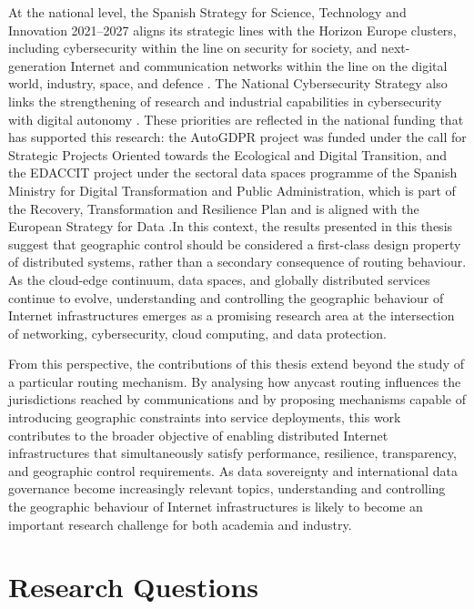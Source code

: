 \documentclass[
A4paper,                %
twoside,                %
openright,              %
chapterprefix=true,     %
12pt,                   %
headings=normal,        %
titlepage=on            %
]{book}
\begin{document}
At the national level, the Spanish Strategy for Science, Technology and Innovation 2021--2027 aligns its strategic lines with the Horizon Europe clusters, including cybersecurity within the line on security for society, and next-generation Internet and communication networks within the line on the digital world, industry, space, and defence \cite{Estrategia2021-2027}. The National Cybersecurity Strategy also links the strengthening of research and industrial capabilities in cybersecurity with digital autonomy \cite{BOE-A-2019-6347Nacional.}. These priorities are reflected in the national funding that has supported this research: the AutoGDPR project was funded under the call for Strategic Projects Oriented towards the Ecological and Digital Transition, and the EDACCIT project under the sectoral data spaces programme of the Spanish Ministry for Digital Transformation and Public Administration, which is part of the Recovery, Transformation and Resilience Plan and is aligned with the European Strategy for Data \cite{PortalSectoriales}.In this context, the results presented in this thesis suggest that geographic control should be considered a first-class design property of distributed systems, rather than a secondary consequence of routing behaviour. As the cloud-edge continuum, data spaces, and globally distributed services continue to evolve, understanding and controlling the geographic behaviour of Internet infrastructures emerges as a promising research area at the intersection of networking, cybersecurity, cloud computing, and data protection.

From this perspective, the contributions of this thesis extend beyond the study of a particular routing mechanism. By analysing how anycast routing influences the jurisdictions reached by communications and by proposing mechanisms capable of introducing geographic constraints into service deployments, this work contributes to the broader objective of enabling distributed Internet infrastructures that simultaneously satisfy performance, resilience, transparency, and geographic control requirements. As data sovereignty and international data governance become increasingly relevant topics, understanding and controlling the geographic behaviour of Internet infrastructures is likely to become an important research challenge for both academia and industry.

\section{Research Questions}
\label{sc:introduction_rqs}
\end{document}
